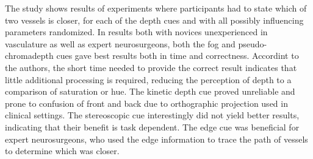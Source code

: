 The study shows results of experiments where participants had to state which of two vessels is closer, for each of the depth cues and with all possibly influencing parameters randomized.
In results both with novices unexperienced in vasculature as well as expert neurosurgeons, both the fog and pseudo-chromadepth cues gave best results both in time and correctness. Accordint to the authors, the short time needed to provide the correct result indicates that little additional processing is required, reducing the perception of depth to a comparison of saturation or hue. The kinetic depth cue proved unreliable and prone to confusion of front and back due to orthographic projection used in clinical settings. The stereoscopic cue interestingly did not yield better results, indicating that their benefit is task dependent. The edge cue was beneficial for expert neurosurgeons, who used the edge information to trace the path of vessels to determine which was closer.
